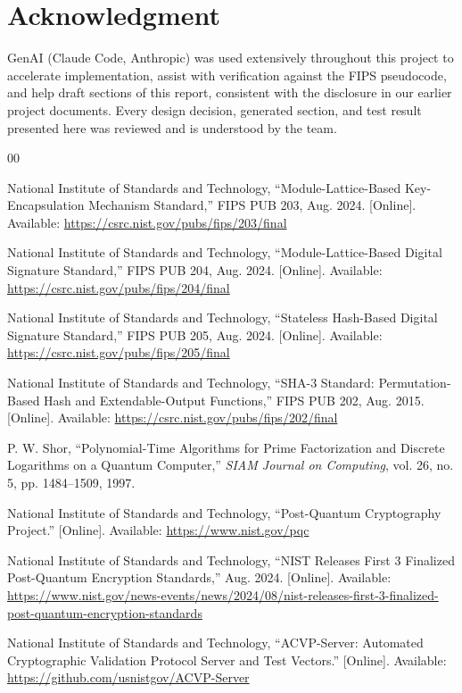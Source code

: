 \documentclass[10pt,conference]{IEEEtran}
\begin{document}
\section*{Acknowledgment}

GenAI (Claude Code, Anthropic) was used extensively throughout this
project to accelerate implementation, assist with verification against
the FIPS pseudocode, and help draft sections of this report, consistent
with the disclosure in our earlier project documents. Every design
decision, generated section, and test result presented here was
reviewed and is understood by the team.

\begin{thebibliography}{00}

 National Institute of Standards and Technology,
``Module-Lattice-Based Key-Encapsulation Mechanism Standard,'' FIPS PUB
203, Aug. 2024. [Online]. Available: \url{https://csrc.nist.gov/pubs/fips/203/final}

 National Institute of Standards and Technology,
``Module-Lattice-Based Digital Signature Standard,'' FIPS PUB 204, Aug.
2024. [Online]. Available: \url{https://csrc.nist.gov/pubs/fips/204/final}

 National Institute of Standards and Technology,
``Stateless Hash-Based Digital Signature Standard,'' FIPS PUB 205, Aug.
2024. [Online]. Available: \url{https://csrc.nist.gov/pubs/fips/205/final}

 National Institute of Standards and Technology,
``SHA-3 Standard: Permutation-Based Hash and Extendable-Output
Functions,'' FIPS PUB 202, Aug. 2015. [Online]. Available:
\url{https://csrc.nist.gov/pubs/fips/202/final}

 P. W. Shor, ``Polynomial-Time Algorithms for Prime
Factorization and Discrete Logarithms on a Quantum Computer,'' \emph{SIAM
Journal on Computing}, vol. 26, no. 5, pp. 1484--1509, 1997.

 National Institute of Standards and Technology,
``Post-Quantum Cryptography Project.'' [Online]. Available:
\url{https://www.nist.gov/pqc}

 National Institute of Standards and Technology,
``NIST Releases First 3 Finalized Post-Quantum Encryption Standards,''
Aug. 2024. [Online]. Available:
\url{https://www.nist.gov/news-events/news/2024/08/nist-releases-first-3-finalized-post-quantum-encryption-standards}

 National Institute of Standards and Technology,
``ACVP-Server: Automated Cryptographic Validation Protocol Server and
Test Vectors.'' [Online]. Available:
\url{https://github.com/usnistgov/ACVP-Server}


\end{thebibliography}
\end{document}
